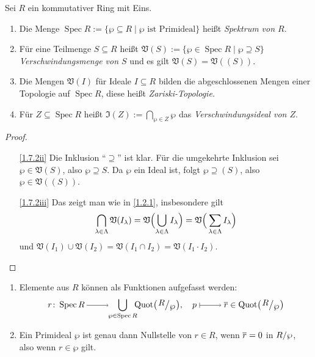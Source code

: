 \documentclass[a4paper,12pt,index=toc]{scrbook}
\theoremstyle{keinenummern} %
\def\V{\mathfrak{V}}
\def\I{\mathfrak{I}}
\newcommand{\Spec}{\operatorname{Spec}}
\newcommand{\Quot}{\operatorname{Quot}}
\def\Bar#1{\ensuremath\overline{#1}}
\begin{document}
\begin{db}\label{1.7.2}
  Sei $R$ ein kommutativer Ring mit Eins.
  \begin{enumerate}
  \item{} Die Menge $\Spec R := \{\wp\subseteq R \mid \wp\text{ ist Primideal}\}$ heißt \emph{Spektrum von $R$}.
  \item{} Für eine Teilmenge $S\subseteq R$ heißt $\V(S) := \{\wp\in\Spec R \mid \wp\supseteq S\}$
    \emph{Verschwindungsmenge von $S$} und es gilt $\V(S)=\V((S))$.
  \item{} Die Mengen $\V(I)$ für Ideale $I\subseteq R$ bilden die abgeschlossenen Mengen einer Topologie auf
    $\Spec R$, diese heißt \emph{Zariski-Topologie}.
  \item{} Für $Z\subseteq\Spec R$ heißt $\I(Z):=\displaystyle\bigcap_{\wp\in Z}\wp$ das \emph{Verschwindungsideal von $Z$}.
  \end{enumerate}
\end{db}
\begin{proof}
  \begin{enumerate}
  \item[\ref{1.7.2ii}] Die Inklusion \enquote{$\supseteq$} ist klar. Für die umgekehrte Inklusion sei $\wp\in\V(S)$, also
    $\wp\supseteq S$. Da $\wp$ ein Ideal ist, folgt $\wp\supseteq (S)$, also $\wp\in\V((S))$.
  \item[\ref{1.7.2iii}] Das zeigt man wie in \cref{1.2.1}, insbesondere gilt
    \[\displaystyle\bigcap_{\lambda\in\Lambda}\V(I_\lambda) =
    \V\Bigl(\bigcup_{\lambda\in\Lambda}I_\lambda\Bigr)=\V\Bigr(\sum_{\lambda\in\Lambda}I_\lambda\Bigr)\] und
    $\V(I_1)\cup\V(I_2)=\V(I_1\cap I_2)=\V(I_1\cdot I_2)$.
  \end{enumerate}
\end{proof}

\begin{db}\label{1.7.3}
  \begin{enumerate}
  \item{} Elemente aus $R$ können als Funktionen aufgefasst werden:
    \[ r\colon \Spec R \ra \!\!\!\bigcup_{\wp\in\Spec R}\!\!\! \Quot\bigl(\Quotient{R}{\wp}\bigr),\quad
    p\mapsto\Bar{r}\in\Quot\bigl(\Quotient{R}{\wp}\bigr) \]
  \item{} Ein Primideal $\wp$ ist genau dann Nullstelle von $r\in R$, wenn $\Bar{r}=0$ in $\Quotient{R}{\wp}$, also wenn
    $r\in \wp$ gilt.
  \end{enumerate}
\end{db}
\end{document}
